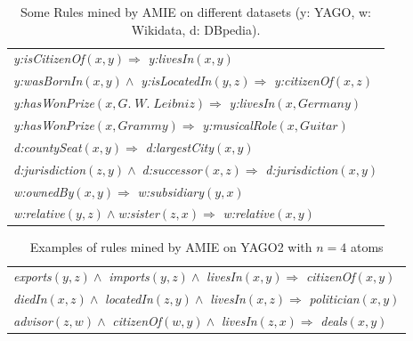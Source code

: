\begin{table}[t]
\begin{tabular}{|l|}
\hline
\emph{y:isCitizenOf}$(x,y) \Rightarrow$ \emph{y:livesIn}$(x,y)$\\
\emph{y:wasBornIn}$(x,y) \wedge$ \emph{y:isLocatedIn}$(y,z) \Rightarrow$ \emph{y:citizenOf}$(x,z)$\\
\emph{y:hasWonPrize}$(x,G.\;W.\;Leibniz) \Rightarrow$ \emph{y:livesIn}$(x,Germany)$\\
\emph{y:hasWonPrize}$(x,Grammy) \Rightarrow$ \emph{y:musicalRole}$(x,Guitar)$\\
\emph{d:countySeat}$(x,y) \Rightarrow$ \emph{d:largestCity}$(x,y)$\\
\emph{d:jurisdiction}$(z,y) \wedge\; $\emph{d:successor}$(x,z) \Rightarrow$ \emph{d:jurisdiction}$(x,y)$\\
\emph{w:ownedBy}$(x,y) \Rightarrow$ \emph{w:subsidiary}$(y, x)$\\
\emph{w:relative}$(y,z) \wedge $\emph{w:sister}$(z, x)  \Rightarrow$ \emph{w:relative}$(x,y)$\\
\hline
\end{tabular}
\caption{Some Rules mined by AMIE on different datasets (y: YAGO, w: Wikidata, d: DBpedia).}\label{rules}
\end{table}

\begin{table}
\hspace*{-2.4ex}
\begin{tabular}{|l|}
\hline
\emph{exports}$(y,z) \wedge$ \emph{imports}$(y,z) \wedge$ \emph{livesIn}$(x,y) \Rightarrow $ \emph{citizenOf}$(x,y)$\\
\emph{diedIn}$(x,z) \wedge$ \emph{locatedIn}$(z,y) \wedge$ \emph{livesIn}$(x,z) \Rightarrow $ \emph{politician}$(x,y)$\\
\emph{advisor}$(z,w) \wedge$ \emph{citizenOf}$(w,y) \wedge$ \emph{livesIn}$(z,x) \Rightarrow $ \emph{deals}$(x,y)$ \\
\hline
\end{tabular}
\caption{Examples of rules mined by AMIE on YAGO2 with $n=4$ atoms}\label{rules4atoms}
\end{table}

